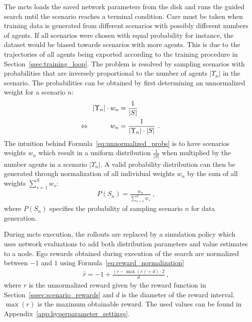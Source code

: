The \gls{mcts} loads the saved network parameters from the disk and runs the guided search until the scenario reaches a terminal condition. Care must be taken when training data is generated from different scenarios with possibly different numbers of agents. If all scenarios were chosen with equal probability for instance, the dataset would be biased towards scenarios with more agents. This is due to the trajectories of all agents being exported according to the training procedure in Section~\ref{ssec:training_loop}. The problem is resolved by sampling scenarios with probabilities that are inversely proportional to the number of agents $|\Upsilon_n|$ in the scenario. The probabilities can be obtained by first determining an unnormalized weight for a scenario $n$:
\begin{align}\label{eq:unnormalized_probs}
    |\Upsilon_n| \cdot w_n & =  \frac{1}{|S|} \nonumber \\
    \llap{$\Leftrightarrow$ \qquad\quad} w_n &  =  \frac{1}{|\Upsilon_n| \cdot |S|}~.
\end{align}
The intuition behind Formula~\ref{eq:unnormalized_probs} is to have scenarios weights $w_n$ which result in a uniform distribution $\frac{1}{|S|}$ when multiplied by the number agents in a scenario $|\Upsilon_n|$. A valid probability distribution can then be generated through normalization of all individual weights $w_n$ by the sum of all weights $\sum_{s=1}^S w_s$:
\begin{gather}
    P(S_n) = \frac{w_n}{\sum_{s=1}^S w_s}~,
\end{gather}
where $P(S_n)$ specifies the probability of sampling scenario $n$ for data generation.

During \gls{mcts} execution, the rollouts are replaced by a simulation policy which uses network evaluations to add both distribution parameters and value estimates to a node. Ego rewards obtained during execution of the search are normalized between $-1$ and $1$ using Formula~\ref{eq:reward_normalization}
\begin{gather}\label{eq:reward_normalization}
    \hat r = -1 + \frac{ (r - \max(r) + d) \cdot 2 }{d}~,
\end{gather}
where $r$ is the unnormalized reward given by the reward function in Section~\ref{sssec:scenario_rewards} and $d$ is the diameter of the reward interval. $\max(r)$ is the maximum obtainable reward. The used values can be found in Appendix~\ref{app:hyperparameter_settings}.

